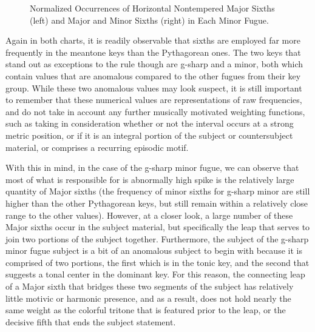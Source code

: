 \begin{figure}[H]
    \begin{center}
    \caption[Normalized Occurrences of Horizontal Nontempered Sixths in Each Minor Fugue. ]{Normalized Occurrences of Horizontal Nontempered Major Sixths (left) and Major and Minor Sixths (right) in Each Minor Fugue.}
    \end{center}
\end{figure}
    
    Again in both charts, it is readily observable that sixths are employed
far more frequently in the meantone keys than the Pythagorean ones. The
two keys that stand out as exceptions to the rule though are g-sharp and
a minor, both which contain values that are anomalous compared to the
other fugues from their key group. While these two anomalous values may
look suspect, it is still important to remember that these numerical
values are representations of raw frequencies, and do not take in
account any further musically motivated weighting functions, such as
taking in consideration whether or not the interval occurs at a strong
metric position, or if it is an integral portion of the subject or
countersubject material, or comprises a recurring episodic motif.

With this in mind, in the case of the g-sharp minor fugue, we can
observe that most of what is responsible for is abnormally high spike is
the relatively large quantity of Major sixths (the frequency of minor
sixths for g-sharp minor are still higher than the other Pythagorean
keys, but still remain within a relatively close range to the other
values). However, at a closer look, a large number of these Major sixths
occur in the subject material, but specifically the leap that serves to
join two portions of the subject together. Furthermore, the subject of
the g-sharp minor fugue subject is a bit of an anomalous subject to
begin with because it is comprised of two portions, the first which is
in the tonic key, and the second that suggests a tonal center in the
dominant key. For this reason, the connecting leap of a Major sixth that
bridges these two segments of the subject has relatively little motivic
or harmonic presence, and as a result, does not hold nearly the same
weight as the colorful tritone that is featured prior to the leap, or
the decisive fifth that ends the subject statement.


    \begin{center}
    \end{center}
    


